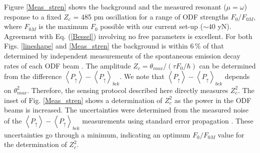 \documentclass[aps,prl,twocolumn,superscriptaddress,floatfix]{revtex4-1}
\begin{document}
Figure \ref{Meas_stren} shows the background and the measured resonant ($\mu=\omega$) response to a fixed $Z_c$ = 485 pm oscillation for a range of ODF strengths $F_{0}/F_{0M}$, where $F_{0M}$ is the maximum $F_0$ possible with our current set-up ($\sim 40$ yN). Agreement with Eq. (\ref{Bessel}) involving no free parameters is excellent. For both Figs. \ref{lineshape} and \ref{Meas_stren} the background is within $6\,\%$ of that determined by independent measurements of the spontaneous emission decay rates of each ODF beam \citep{Britton2012}. The amplitude $Z_c=\theta_{max}/(\tau F_{0}/\hbar)$ can be determined from the difference $\left< P_\uparrow \right>- \left< P_\uparrow \right>_{bck}$. We note that $\left< P_\uparrow \right>- \left< P_\uparrow \right>_{bck}$ depends on $\theta_{max}^2$. Therefore, the sensing protocol described here directly measures $Z_c^2$. The inset of Fig. \ref{Meas_stren} shows a determination of $Z_c^2$ as the power in the ODF beams is increased. The uncertainties were determined from the measured noise of the $\left< P_\uparrow \right>- \left< P_\uparrow \right>_{bck}$ measurements using standard error propagation \citep{SuppMat}. These uncertainties go through a minimum, indicating an optimum $F_{0}/F_{0M}$ value for the determination of $Z_c^2$.
\end{document}

